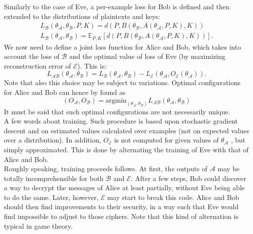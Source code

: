 \documentclass[%
    corpo=11pt,
    twoside,
    stile=classica,
    oldstyle,
    autoretitolo,
    tipotesi=magistrale,
    greek,
    evenboxes,
    english
]{toptesi}
\begin{document}
Similarly to the case of Eve, a per-example loss for Bob is defined and then extended to the distributions of plaintexts and keys:
\begin{align}
L_{\mathcal{B}}\left(\theta_{\mathcal{A}}, \theta_{\mathcal{B}}, P, K \right) = d\left(P, B(\theta_{\mathcal{B}}, A(\theta_{\mathcal{A}}, P, K), K ) \right) \nonumber \\ 
L_{\mathcal{B}}\left(\theta_{\mathcal{A}}, \theta_{\mathcal{B}}\right) = \mathbb{E}_{P,K}\left[ d\left(P, B(\theta_{\mathcal{B}}, A(\theta_{\mathcal{A}}, P, K), K ) \right)\right].
\end{align}
We now need to define a joint loss function for Alice and Bob, which takes into account the loss of $\mathcal{B}$ and the optimal value of loss of Eve (by maximizing reconstruction error of $\mathcal{E}$). This is: 
\begin{equation}
L_{\mathcal{A}\mathcal{B}}(\theta_{\mathcal{A}}, \theta_{\mathcal{B}}) = L_{\mathcal{B}}\left(\theta_{\mathcal{A}}, \theta_{\mathcal{B}}\right) - L_{\mathcal{E}}(\theta_{\mathcal{A}}, O_{\mathcal{E}}\left(\theta_{\mathcal{A}} \right)).
\end{equation}
Note that also this choice may be subject to variations. Optimal configurations for Alice and Bob can hence by found as 
\begin{equation}
(O_{\mathcal{A}}, O_{\mathcal{B}}) = \textrm{argmin}_{(\theta_{\mathcal{A}}, \theta_{\mathcal{B}})}L_{\mathcal{A}\mathcal{B}}(\theta_{\mathcal{A}}, \theta_{\mathcal{B}}) 
\end{equation}
It must be said that such optimal configurations are not necessarily unique. \\
A few words about training. Such procedure is based upon stochastic gradient descent and on estimated values calculated over examples (not on expected values over a distribution). In addition, $O_{\mathcal{E}}$ is not computed for given values of $\theta_{\mathcal{A}}$ , but simply approximated. This is done by alternating the training of Eve with that of Alice and Bob. \\
Roughly speaking, training proceeds follows. At first, the outputs of $\mathcal{A}$ may be totally incomprehensible for both $\mathcal{B}$ and $\mathcal{E}$. After a few steps, Bob could discover a way to decrypt the messages of Alice at least partially, without Eve being able to do the same. Later, however, $\mathcal{E}$ may start to break this code. Alice and Bob should then find improvements to their security, in a way such that Eve would find impossible to adjust to those ciphers. Note that this kind of alternation is typical in game theory. 
\end{document}
